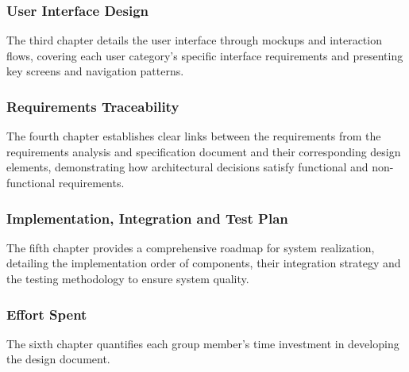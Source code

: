 \subsubsection{User Interface Design}
The third chapter details the user interface through mockups and interaction flows, covering each user category's specific interface requirements and presenting key screens and navigation patterns.

\subsubsection{Requirements Traceability}
The fourth chapter establishes clear links between the requirements from the requirements analysis and specification document and their corresponding design elements, demonstrating how architectural decisions satisfy functional and non-functional requirements.

\subsubsection{Implementation, Integration and Test Plan}
The fifth chapter provides a comprehensive roadmap for system realization, detailing the implementation order of components, their integration strategy and the testing methodology to ensure system quality.

\subsubsection{Effort Spent}
The sixth chapter quantifies each group member's time investment in developing the design document.
